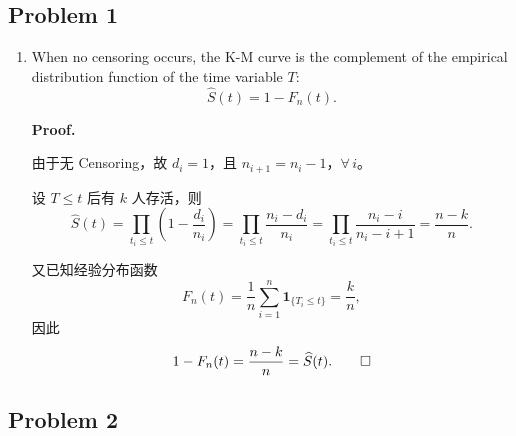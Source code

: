 \subsection{Problem 1}

\begin{enumerate}

\item When no censoring occurs, the K-M curve is the complement of the empirical distribution function of the time variable $T$:
\[
\widehat{S}(t) = 1 - F_n(t).
\]

\textbf{Proof.}

由于无 Censoring，故 $d_i = 1$，且 $n_{i+1} = n_i - 1$，$\forall\, i$。

设 $T \le t$ 后有 $k$ 人存活，则
\[
\widehat{S}(t) = \prod_{t_i \le t}\!\left(1 - \frac{d_i}{n_i}\right)
= \prod_{t_i \le t} \frac{n_i - d_i}{n_i}
= \prod_{t_i \le t} \frac{n_i - i}{n_i - i + 1}
= \frac{n - k}{n}.
\]

又已知经验分布函数
\[
F_n(t) = \frac{1}{n}\sum_{i=1}^{n} \mathbf{1}_{\{T_i \le t\}} = \frac{k}{n},
\]
因此
\[
1 - F_n(t) = \frac{n-k}{n} = \widehat{S}(t). \qedhere
\]
\end{enumerate}

\subsection{Problem 2}

